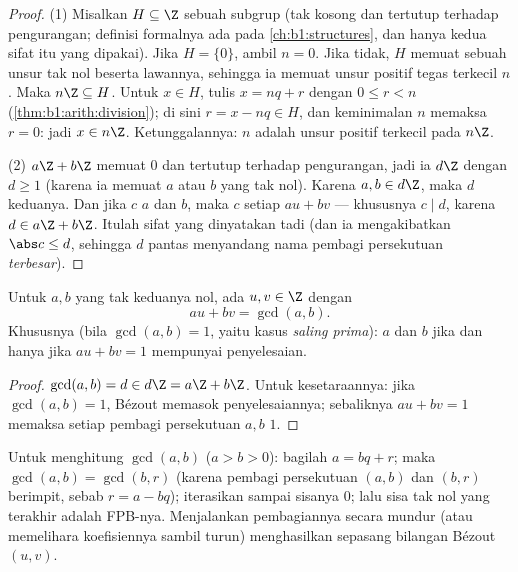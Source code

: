 \begin{proof}
(1) Misalkan $H \subseteq \Z$ sebuah subgrup (tak kosong dan tertutup terhadap
pengurangan; definisi formalnya ada pada \cref{ch:b1:structures},
dan hanya kedua sifat itu yang dipakai). Jika $H = \{0\}$, ambil $n = 0$.
Jika tidak, $H$ memuat sebuah unsur tak nol beserta lawannya, sehingga ia memuat
unsur positif tegas terkecil $n$. Maka $n\Z \subseteq H$. Untuk $x
\in H$, tulis $x = nq + r$ dengan $0 \leq r < n$
(\cref{thm:b1:arith:division}); di sini $r = x - nq \in H$, dan keminimalan
$n$ memaksa $r = 0$: jadi $x \in n\Z$. Ketunggalannya: $n$ adalah unsur positif
terkecil pada $n\Z$.

(2)  $a\Z + b\Z$ memuat $0$ dan tertutup terhadap pengurangan, jadi ia
$d\Z$ dengan $d \geq 1$ (karena ia memuat $a$ atau $b$ yang tak nol). Karena $a, b
\in d\Z$, maka $d$  keduanya. Dan jika $c$  $a$ dan $b$, maka $c$
 setiap $au + bv$ --- khususnya $c \mid d$, karena $d \in a\Z
+ b\Z$. Itulah sifat yang dinyatakan tadi (dan ia mengakibatkan $\abs c \leq
d$, sehingga $d$ pantas menyandang nama pembagi persekutuan \emph{terbesar}).
\end{proof}

\begin{corollary}\label{cor:b1:arith:bezout}
Untuk $a, b$ yang tak keduanya nol, ada $u, v \in \Z$ dengan
\[
au + bv = \gcd(a, b) .
\]
Khususnya (bila $\gcd(a,b) = 1$, yaitu kasus \emph{saling
prima}): $a$ dan $b$  jika dan hanya jika $au + bv = 1$ mempunyai
penyelesaian.
\end{corollary}

\begin{proof}
$\gcd(a,b) = d \in d\Z = a\Z + b\Z$. Untuk kesetaraannya: jika
$\gcd(a,b) = 1$, Bézout memasok penyelesaiannya; sebaliknya $au + bv =
1$ memaksa setiap pembagi persekutuan $a, b$  $1$.
\end{proof}

\begin{method}\label{met:b1:arith:euclid}
Untuk menghitung $\gcd(a, b)$ ($a > b > 0$): bagilah $a = bq + r$; maka
$\gcd(a, b) = \gcd(b, r)$ (karena pembagi persekutuan $(a,b)$ dan $(b,r)$
berimpit, sebab $r = a - bq$); iterasikan sampai sisanya $0$; lalu
sisa tak nol yang terakhir adalah FPB-nya. Menjalankan
pembagiannya secara mundur (atau memelihara koefisiennya sambil turun)
menghasilkan sepasang bilangan Bézout $(u, v)$.
\end{method}

